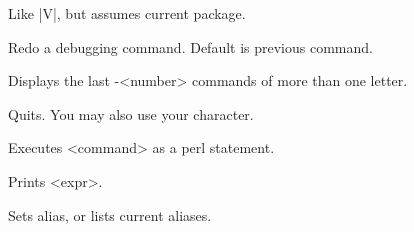 \begin{enum}{2.5cm}
Like |V|, but assumes current package.

\Xi{|!| [ [-]<number>]}
Redo a debugging command. Default is previous command.

Displays the last -<number> commands of more than one letter.

Quits. You may also use your  character.

Executes <command> as a perl statement.

Prints <expr>.

Sets alias, or lists current aliases.

\end{enum}
\newpage
\vfill \vfill \vfill
{}


